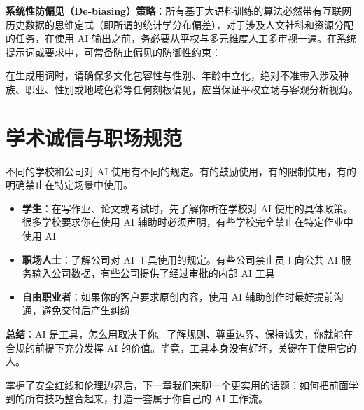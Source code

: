 \textbf{系统性防偏见（De-biasing）策略}：所有基于大语料训练的算法必然带有互联网历史数据的思维定式（即所谓的统计学分布偏差），对于涉及人文社科和资源分配的任务，在使用 AI 输出之前，务必要从平权与多元维度人工多审视一遍。在系统提示词或要求中，可常备防止偏见的防御性约束：

\begin{promptbox}
在生成用词时，请确保多文化包容性与性别、年龄中立化，绝对不准带入涉及种族、职业、性别或地域色彩等任何刻板偏见，应当保证平权立场与客观分析视角。
\end{promptbox}

\section{学术诚信与职场规范}

不同的学校和公司对 AI 使用有不同的规定。有的鼓励使用，有的限制使用，有的明确禁止在特定场景中使用。

\begin{itemize}
  \item \textbf{学生}：在写作业、论文或考试时，先了解你所在学校对 AI 使用的具体政策。很多学校要求你在使用 AI 辅助时必须声明，有些学校完全禁止在特定作业中使用 AI
  \item \textbf{职场人士}：了解公司对 AI 工具使用的规定。有些公司禁止员工向公共 AI 服务输入公司数据，有些公司提供了经过审批的内部 AI 工具
  \item \textbf{自由职业者}：如果你的客户要求原创内容，使用 AI 辅助创作时最好提前沟通，避免交付后产生纠纷
\end{itemize}

\textbf{总结}：AI 是工具，怎么用取决于你。了解规则、尊重边界、保持诚实，你就能在合规的前提下充分发挥 AI 的价值。毕竟，工具本身没有好坏，关键在于使用它的人。

掌握了安全红线和伦理边界后，下一章我们来聊一个更实用的话题：如何把前面学到的所有技巧整合起来，打造一套属于你自己的 AI 工作流。
